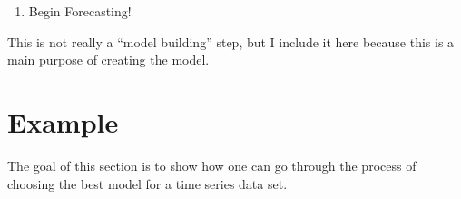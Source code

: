 \documentclass[
]{book}
\providecommand{\tightlist}{%
  \setlength{\itemsep}{0pt}\setlength{\parskip}{0pt}}
\theoremstyle{definition}
\theoremstyle{definition}
\theoremstyle{definition}
\theoremstyle{definition}
\theoremstyle{remark}
\begin{document}
\begin{enumerate}
\def\labelenumi{\arabic{enumi}.}
\setcounter{enumi}{5}
\tightlist
\item
  Begin Forecasting!
\end{enumerate}

This is not really a ``model building'' step, but I include it here because this is a main purpose of creating the model.

\hypertarget{example}{%
\section{Example}\label{example}}

The goal of this section is to show how one can go through the process of choosing the best model for a time series data set.
\end{document}
